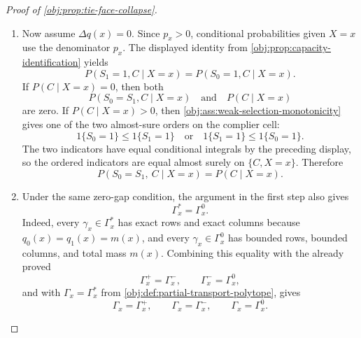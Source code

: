 \begin{proof}[Proof of \cref{obj:prop:tie-face-collapse}]
\begin{enumerate}
Conversely, suppose \(\Delta q(x)=0\). Then
\[
q_0(x)=q_1(x)=m(x).
\]
If \(\gamma_x\in\Gamma_x^{+}\), then its exact row constraints give
\[
\operatorname{tot}(\gamma_x)
=
\sum_i\operatorname{row}_i(\gamma_x)
=
\sum_i\ell_i(x)
=
q_0(x)
=
m(x),
\]
so \(\gamma_x\in\Gamma_x^\ast\). Since \(q_1(x)\le q_0(x)\), the column-exactness argument above gives
\[
\operatorname{col}_j(\gamma_x)=h_j(x)\qquad\text{for every }j,
\]
and hence \(\gamma_x\in\Gamma_x^{-}\). The reverse inclusion follows symmetrically from exact columns and row-exactness. Therefore
\[
\Gamma_x^{+}=\Gamma_x^{-}.
\]
The same reasoning sends every element of \(\Gamma_x^{-}\) to \(\Gamma_x^0\), while \(\Gamma_x^0\subseteq\Gamma_x^{-}\) is immediate from the defining constraints. Hence
\[
\Gamma_x^{-}=\Gamma_x^0.
\]
This proves
\[
\bigl(\Gamma_x^{+}=\Gamma_x^{-}\ \text{and}\ \Gamma_x^{-}=\Gamma_x^{0}\bigr)
\Longleftrightarrow
\Delta q(x)=0.
\]

\item Now assume \(\Delta q(x)=0\). Since \(p_x>0\), conditional probabilities given \(X=x\) use the denominator \(p_x\). The displayed identity from \cref{obj:prop:capacity-identification} yields
\[
P(S_1=1,C\mid X=x)=P(S_0=1,C\mid X=x).
\]
If \(P(C\mid X=x)=0\), then both
\[
P(S_0=S_1,C\mid X=x)
\quad\text{and}\quad
P(C\mid X=x)
\]
are zero. If \(P(C\mid X=x)>0\), then \cref{obj:ass:weak-selection-monotonicity} gives one of the two almost-sure orders on the complier cell:
\[
1\{S_0=1\}\le 1\{S_1=1\}
\quad\text{or}\quad
1\{S_1=1\}\le 1\{S_0=1\}.
\]
The two indicators have equal conditional integrals by the preceding display, so the ordered indicators are equal almost surely on \(\{C,X=x\}\). Therefore
\[
P(S_0=S_1,\ C\mid X=x)=P(C\mid X=x).
\]

\item Under the same zero-gap condition, the argument in the first step also gives
\[
\Gamma_x^\ast=\Gamma_x^0.
\]
Indeed, every \(\gamma_x\in\Gamma_x^\ast\) has exact rows and exact columns because
\(q_0(x)=q_1(x)=m(x)\), and every \(\gamma_x\in\Gamma_x^0\) has bounded rows, bounded columns, and total mass \(m(x)\). Combining this equality with the already proved
\[
\Gamma_x^+=\Gamma_x^-,
\qquad
\Gamma_x^-=\Gamma_x^0,
\]
and with \(\Gamma_x=\Gamma_x^\ast\) from \cref{obj:def:partial-transport-polytope}, gives
\[
\Gamma_x=\Gamma_x^{+},
\qquad
\Gamma_x=\Gamma_x^{-},
\qquad
\Gamma_x=\Gamma_x^{0}.
\]


\end{enumerate}
\end{proof}
